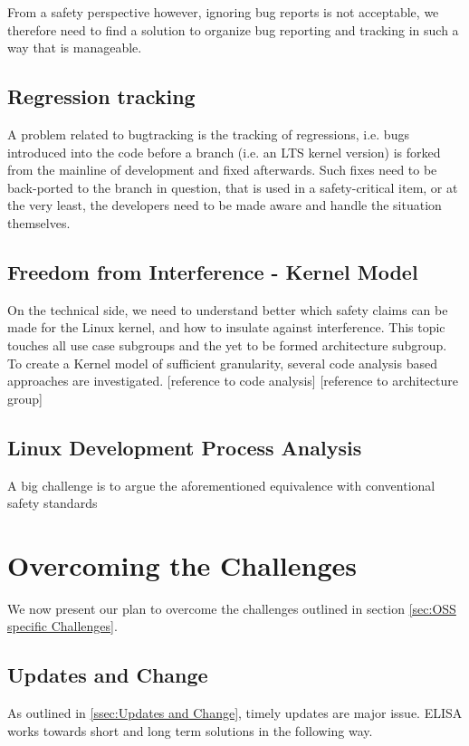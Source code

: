 \documentclass[12pt]{ElisaPaper}
\begin{document}
From a safety perspective however, ignoring bug reports is not acceptable, we therefore need to find a solution to organize bug reporting and tracking in such a way that is manageable.

\subsection{Regression tracking}
A problem related to bugtracking is the tracking of regressions, i.e. bugs introduced into the code before a branch (i.e. an LTS kernel version) is forked from the mainline of development and fixed afterwards.
Such fixes need to be back-ported to the branch in question, that is used in a safety-critical item, or at the very least, the developers need to be made aware and handle the situation themselves.



\subsection{Freedom from Interference - Kernel Model}
On the technical side, we need to understand better which safety claims can be made for the Linux kernel, and how to insulate against interference. 
This topic touches all use case subgroups and the yet to be formed architecture subgroup.
To create a Kernel model of sufficient granularity, several code analysis based approaches are investigated.
[reference to code analysis]
[reference to architecture group]

\subsection{Linux Development Process Analysis}
A big challenge is to argue the aforementioned equivalence with conventional safety standards 


\section{Overcoming the Challenges}
We now present our plan to overcome the challenges outlined in section \ref{sec:OSS specific Challenges}.

\subsection{Updates and Change}
As outlined in \ref{ssec:Updates and Change}, timely updates are major issue.
ELISA works towards short and long term solutions in the following way.
\end{document}
